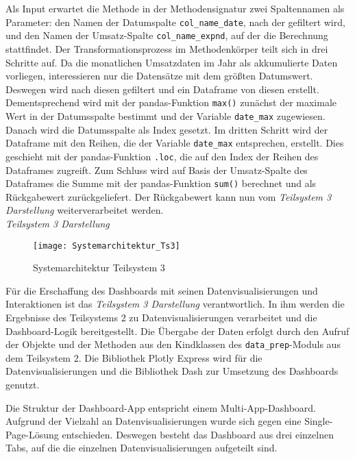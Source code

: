     Als Input erwartet die Methode in der Methodensignatur zwei Spaltennamen als Parameter: den Namen der Datumspalte \texttt{col\_name\_date}, nach der gefiltert wird,
    und den Namen der Umsatz-Spalte \texttt{col\_name\_expnd}, auf der die Berechnung stattfindet. Der Transformationsprozess im Methodenkörper teilt sich in drei Schritte auf. Da die monatlichen Umsatzdaten im Jahr als 
    akkumulierte Daten vorliegen, interessieren nur die Datensätze mit dem größten Datumswert. Deswegen
    wird nach diesen gefiltert und ein Dataframe von diesen erstellt. Dementsprechend wird mit der pandas-Funktion \texttt{max()} 
    zunächst der maximale Wert in der Datumsspalte bestimmt und der Variable \texttt{date\_max} zugewiesen. Danach wird die Datumsspalte als Index gesetzt. 
    Im dritten Schritt wird der Dataframe mit den Reihen, die der Variable \texttt{date\_max} entsprechen, erstellt. Dies geschieht mit der pandas-Funktion \texttt{.loc}, die
    auf den Index der Reihen des Dataframes zugreift. Zum Schluss wird auf Basis der Umsatz-Spalte des Dataframes die Summe mit der pandas-Funktion \texttt{sum()} berechnet 
    und als Rückgabewert zurückgeliefert. Der Rückgabewert kann nun vom \textit{Teilsystem 3 Darstellung} weiterverarbeitet werden.\\

    \noindent
    \textit{Teilsystem 3 Darstellung}\\

    \begin{figure}[H]
        \centering
            \texttt{[image: Systemarchitektur\_Ts3]}
            \caption{Systemarchitektur Teilsystem 3}
            \label{fig:Systemarchitektur Teilsystem 3}
    \end{figure}

    Für die Erschaffung des Dashboards mit seinen Datenvisualisierungen und Interaktionen ist das \textit{Teilsystem 3 Darstellung} verantwortlich.
    In ihm werden die Ergebnisse des Teilsystems 2 zu Datenvisualisierungen verarbeitet und die Dashboard-Logik bereitgestellt.
    Die Übergabe der Daten erfolgt durch den Aufruf der Objekte und der Methoden aus den Kindklassen des \texttt{data\_prep}-Moduls aus dem Teilsystem 2.
    Die Bibliothek Plotly Express  wird für die Datenvisualisierungen und die Bibliothek Dash zur Umsetzung des Dashboards genutzt. 
    
    Die Struktur der Dashboard-App entspricht einem Multi-App-Dashboard.
    Aufgrund der Vielzahl an Datenvisualisierungen wurde sich gegen eine Single-Page-Lösung entschieden. Deswegen besteht das Dashboard
    aus drei einzelnen Tabs, auf die die einzelnen Datenvisualisierungen aufgeteilt sind.
    
